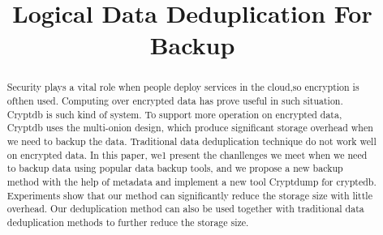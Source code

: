 \documentclass[sigconf]{acmart}
\begin{document}
\title{Logical Data Deduplication For Backup}





\begin{abstract}

Security plays a vital role when people deploy services in the cloud,so encryption is ofthen used. Computing over encrypted data has prove useful in such situation. Cryptdb\citep{popa2011cryptdb} is such kind of system. To support more operation on encrypted data, Cryptdb uses the multi-onion design, which produce significant storage overhead when we need to backup the data. Traditional data deduplication technique do not work well on encrypted data. In this paper, we1 present the chanllenges we meet when we need to backup data using popular data backup tools, and we propose a new backup method with the help of metadata and implement a new tool Cryptdump for cryptedb. Experiments show that our method can  significantly reduce the storage size with little overhead. Our deduplication method can also be used together with traditional data deduplication methods to further reduce the storage size.








\end{abstract}



\maketitle












 
\end{document}
